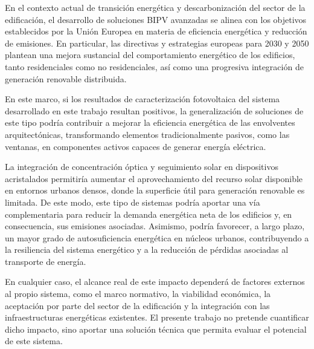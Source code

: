 En el contexto actual de transición energética y descarbonización del sector de la edificación, el desarrollo de soluciones BIPV avanzadas se alinea con los objetivos establecidos por la Unión Europea en materia de eficiencia energética y reducción de emisiones. En particular, las directivas y estrategias europeas para 2030 y 2050 plantean una mejora sustancial del comportamiento energético de los edificios, tanto residenciales como no residenciales, así como una progresiva integración de generación renovable distribuida.

En este marco, si los resultados de caracterización fotovoltaica del sistema desarrollado en este trabajo resultan positivos, la generalización de soluciones de este tipo podría contribuir a mejorar la eficiencia energética de las envolventes arquitectónicas, transformando elementos tradicionalmente pasivos, como las ventanas, en componentes activos capaces de generar energía eléctrica.

La integración de concentración óptica y seguimiento solar en dispositivos acristalados permitiría aumentar el aprovechamiento del recurso solar disponible en entornos urbanos densos, donde la superficie útil para generación renovable es limitada. De este modo, este tipo de sistemas podría aportar una vía complementaria para reducir la demanda energética neta de los edificios y, en consecuencia, sus emisiones asociadas. Asimismo, podría favorecer, a largo plazo, un mayor grado de autosuficiencia energética en núcleos urbanos, contribuyendo a la resiliencia del sistema energético y a la reducción de pérdidas asociadas al transporte de energía.

En cualquier caso, el alcance real de este impacto dependerá de factores externos al propio sistema, como el marco normativo, la viabilidad económica, la aceptación por parte del sector de la edificación y la integración con las infraestructuras energéticas existentes. El presente trabajo no pretende cuantificar dicho impacto, sino aportar una solución técnica que permita evaluar el potencial de este sistema.
